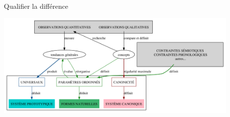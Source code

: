 \begin{frame}[t]{Qualifier la différence}
\begin{center}
\includegraphics[width=120mm]{protonatcanon}
\label{fig:canonicity}
\end{center}
\end{frame}

